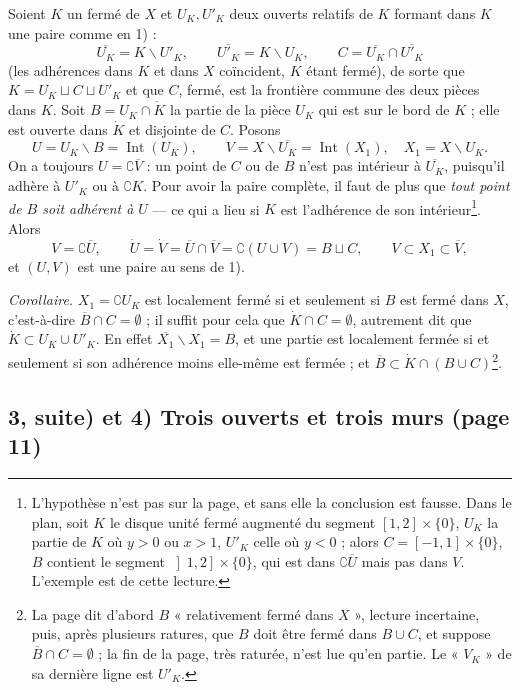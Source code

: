 \documentclass[11pt,a4paper]{article}
\begin{document}
Soient $K$ un fermé de $X$ et $U_K, U'_K$ deux ouverts relatifs de $K$ formant
dans $K$ une paire comme en 1) :
\[
\overline{U_K} = K \smallsetminus U'_K, \qquad \overline{U'_K} = K
\smallsetminus U_K, \qquad C = \overline{U_K} \cap \overline{U'_K}
\]
(les adhérences dans $K$ et dans $X$ coïncident, $K$ étant fermé), de sorte
que $K = U_K \sqcup C \sqcup U'_K$ et que $C$, fermé, est la frontière commune
des deux pièces dans $K$. Soit $B = U_K \cap \dot{K}$ la partie de la pièce
$U_K$ qui est sur le bord de $K$ ; elle est ouverte dans $\dot{K}$ et disjointe
de $C$. Posons
\[
U = U_K \smallsetminus B = \operatorname{Int}(U_K), \qquad
V = X \smallsetminus \overline{U_K} = \operatorname{Int}(X_1), \quad X_1 = X
\smallsetminus U_K .
\]
On a toujours $U = \complement \overline{V}$ : un point de $C$ ou de $B$ n'est
pas intérieur à $\overline{U_K}$, puisqu'il adhère à $U'_K$ ou à $\complement
K$. Pour avoir la paire complète, il faut de plus que \emph{tout point de $B$
soit adhérent à $U$} — ce qui a lieu si $K$ est l'adhérence de son
intérieur\footnote{L'hypothèse n'est pas sur la page, et sans elle la
conclusion est fausse. Dans le plan, soit $K$ le disque unité fermé augmenté du
segment $[1, 2] \times \{0\}$, $U_K$ la partie de $K$ où $y > 0$ ou $x > 1$,
$U'_K$ celle où $y < 0$ ; alors $C = [-1, 1] \times \{0\}$, $B$ contient le
segment $\left]1, 2\right] \times \{0\}$, qui est dans $\complement
\overline{U}$ mais pas dans $V$. L'exemple est de cette lecture.}. Alors
\[
V = \complement \overline{U}, \qquad
\dot{U} = \dot{V} = \overline{U} \cap \overline{V} = \complement(U \cup V) = B
\sqcup C, \qquad V \subset X_1 \subset \overline{V} ,
\]
et $(U, V)$ est une paire au sens de 1).

\emph{Corollaire.} $X_1 = \complement U_K$ est localement fermé si et
seulement si $B$ est fermé dans $X$, c'est-à-dire $\overline{B} \cap C =
\emptyset$ ; il suffit pour cela que $\dot{K} \cap C = \emptyset$, autrement dit
que $\dot{K} \subset U_K \cup U'_K$. En effet $\overline{X_1} \smallsetminus X_1
= B$, et une partie est localement fermée si et seulement si son adhérence
moins elle-même est fermée ; et $\overline{B} \subset \dot{K} \cap (B \cup
C)$\footnote{La page dit d'abord $B$ « relativement fermé dans $X$ », lecture
incertaine, puis, après plusieurs ratures, que $B$ doit être fermé dans $B \cup
C$, et suppose $\overline{B} \cap C = \emptyset$ ; la fin de la page, très
raturée, n'est lue qu'en partie. Le « $V_K$ » de sa dernière ligne est
$U'_K$.}.

\subsection*{3, suite) et 4) Trois ouverts et trois murs (page 11)}
\end{document}
